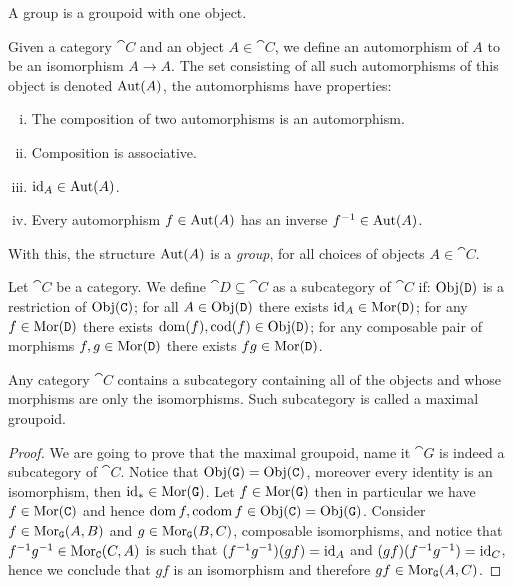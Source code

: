 \begin{definition}[Group]\label{def: group}
    A group is a groupoid with one object.
\end{definition}

\begin{definition}[Automorphism]
    Given a category \(\cat C\) and an object  \(A \in \cat C\), we define an
    automorphism of \(A\) to be an isomorphism \(A \to A\). The set consisting of
    all such automorphisms of this object is denoted \(\operatorname{Aut}(A)\), the
    automorphisms have properties:
    \begin{enumerate}[i.]
        \item The composition of two automorphisms is an automorphism.
        \item Composition is associative.
        \item \(\operatorname{id}_A \in \operatorname{Aut}(A)\).
        \item Every automorphism \(f \in \operatorname{Aut}(A)\) has an inverse \(f^{-1}
              \in \operatorname{Aut}(A)\).
    \end{enumerate}
    With this, the structure \(\operatorname{Aut}(A)\) is a \emph{group}, for all choices of
    objects \(A \in \cat{C}\).
\end{definition}

\begin{definition}[Subcategory]\label{def: subcategory}
    Let \(\cat C\) be a category. We define \(\cat D \subseteq \cat C\) as a
    subcategory of \(\cat C\) if: \(\operatorname{Obj}(\texttt D)\) is a restriction of \(\operatorname{Obj}(\texttt
    C)\); for all \(A \in \operatorname{Obj}(\texttt D)\) there exists \(\operatorname{id}_A \in \operatorname{Mor}(\texttt D)\);
    for any \(f \in \operatorname{Mor}(\texttt D)\) there exists \(\operatorname{dom}(f), \operatorname{cod}(f) \in
    \operatorname{Obj}(\texttt D)\); for any composable pair of morphisms \(f, g \in \operatorname{Mor}(\texttt D)\)
    there exists \(f g \in \operatorname{Mor}(\texttt D)\).
\end{definition}

\begin{lemma}
    Any category \(\cat C\) contains a subcategory containing all of the objects
    and whose morphisms are only the isomorphisms. Such subcategory is called a
    maximal groupoid.
\end{lemma}

\begin{proof}
    We are going to prove that the maximal groupoid, name it \(\cat G\) is indeed
    a subcategory of \(\cat C\). Notice that \(\operatorname{Obj}(\texttt G) = \operatorname{Obj}(\texttt C)\),
    moreover every identity is an isomorphism, then \(\operatorname{id}_{*} \in \operatorname{Mor}(\texttt G)\).
    Let \(f \in \operatorname{Mor}(\texttt G)\) then in particular we have \(f \in \operatorname{Mor}(\texttt C)\)
    and hence \(\operatorname{dom} f, \operatorname{codom} f \in \operatorname{Obj}(\texttt C) =
    \operatorname{Obj}(\texttt G)\). Consider \(f \in \operatorname{Mor}_{\texttt G}(A, B)\) and \(g \in \operatorname{Mor}_{\texttt
        G}(B, C)\), composable isomorphisms, and notice that \(f^{-1}  g^{-1}
    \in \operatorname{Mor}_{\texttt C}(C, A)\) is such that \((f^{-1}  g^{-1})  (g
    f) = \operatorname{id}_A\) and \((g  f)  (f^{-1}  g^{-1}) = \operatorname{id}_C\), hence we
    conclude that \(g  f\) is an isomorphism and therefore \(g  f \in
    \operatorname{Mor}_{\texttt G}(A, C)\).
\end{proof}

